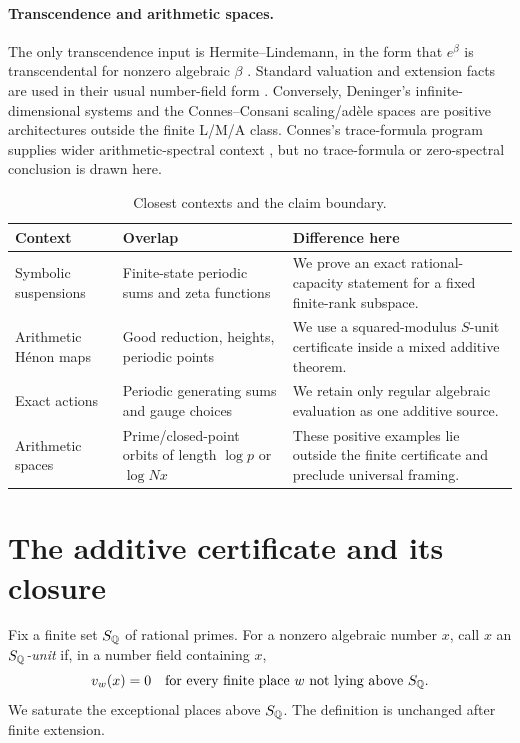 \documentclass[11pt]{article}
\theoremstyle{definition}
\theoremstyle{remark}
\begin{document}
\paragraph{Transcendence and arithmetic spaces.}
The only transcendence input is Hermite--Lindemann, in the form that
$e^\beta$ is transcendental for nonzero algebraic $\beta$
\citep{baker_2022}.  Standard valuation and extension facts are used in their
usual number-field form \citep{neukirch_1999}.  Conversely, Deninger's
infinite-dimensional systems and the Connes--Consani scaling/ad\`ele spaces
are positive architectures outside the finite L/M/A class.  Connes's
trace-formula program supplies wider arithmetic-spectral context
\citep{connes_1999}, but no trace-formula or zero-spectral conclusion is
drawn here.

\begin{table}[t]
\centering
\small
\caption{Closest contexts and the claim boundary.}
\label{tab:related-boundary}
\begin{tabularx}{\textwidth}{@{}>{\raggedright\arraybackslash}p{}
  >{\raggedright\arraybackslash}X >{\raggedright\arraybackslash}X@{}}
\toprule
Context & Overlap & Difference here \\
\midrule
Symbolic suspensions & Finite-state periodic sums and zeta functions & We prove an exact rational-capacity statement for a fixed finite-rank subspace. \\
Arithmetic H\'enon maps & Good reduction, heights, periodic points & We use a squared-modulus $S$-unit certificate inside a mixed additive theorem. \\
Exact actions & Periodic generating sums and gauge choices & We retain only regular algebraic evaluation as one additive source. \\
Arithmetic spaces & Prime/closed-point orbits of length $\log p$ or $\log Nx$ & These positive examples lie outside the finite certificate and preclude universal framing. \\
\bottomrule
\end{tabularx}
\end{table}
\FloatBarrier

\section{The additive certificate and its closure}
\label{sec:setup}

Fix a finite set $S_{\mathbb Q}$ of rational primes.  For a nonzero algebraic number
$x$, call $x$ an \emph{$S_{\mathbb Q}$-unit} if, in a number field containing $x$,
\begin{equation}
 v_w(x)=0
 \quad\text{for every finite place $w$ not lying above $S_{\mathbb Q}$.}
 \label{eq:sunit}
\end{equation}
We saturate the exceptional places above $S_{\mathbb Q}$.  The definition is unchanged
after finite extension.
\end{document}
